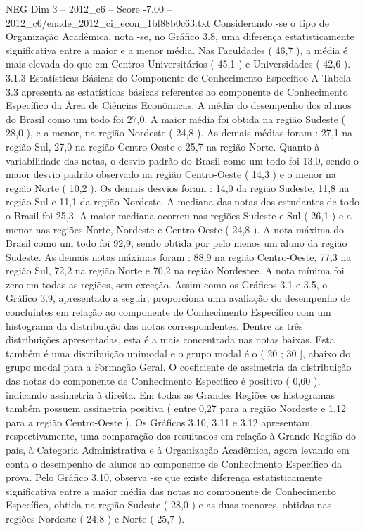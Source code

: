 \begin{textsample}{NEG Dim 3 – 2012\_c6 – Score -7.00 – 2012\_c6/enade\_2012\_ci\_econ\_1bf88b0c63.txt}
Considerando -se o tipo de Organização Acadêmica, nota -se, no Gráfico 3.8, uma diferença estatisticamente significativa entre a maior e a menor média.
Nas Faculdades ( 46,7 ), a média é mais elevada do que em Centros Universitários ( 45,1 ) e Universidades ( 42,6 ). 3.1.3 Estatísticas Básicas do Componente de Conhecimento Específico A Tabela 3.3 apresenta as estatísticas básicas referentes ao componente de Conhecimento Específico da Área de Ciências Econômicas.
A média do desempenho dos alunos do Brasil como um todo foi 27,0.
A maior média foi obtida na região Sudeste ( 28,0 ), e a menor, na região Nordeste ( 24,8 ).
As demais médias foram : 27,1 na região Sul, 27,0 na região Centro-Oeste e 25,7 na região Norte.
Quanto à variabilidade das notas, o desvio padrão do Brasil como um todo foi 13,0, sendo o maior desvio padrão observado na região Centro-Oeste ( 14,3 ) e o menor na região Norte ( 10,2 ).
Os demais desvios foram : 14,0 da região Sudeste, 11,8 na região Sul e 11,1 da região Nordeste.
A mediana das notas dos estudantes de todo o Brasil foi 25,3.
A maior mediana ocorreu nas regiões Sudeste e Sul ( 26,1 ) e a menor nas regiões Norte, Nordeste e Centro-Oeste ( 24,8 ).
A nota máxima do Brasil como um todo foi 92,9, sendo obtida por pelo menos um aluno da região Sudeste.
As demais notas máximas foram : 88,9 na região Centro-Oeste, 77,3 na região Sul, 72,2 na região Norte e 70,2 na região Nordestee.
A nota mínima foi zero em todas as regiões, sem exceção.
Assim como os Gráficos 3.1 e 3.5, o Gráfico 3.9, apresentado a seguir, proporciona uma avaliação do desempenho de concluintes em relação ao componente de Conhecimento Específico com um histograma da distribuição das notas correspondentes.
Dentre as três distribuições apresentadas, esta é a mais concentrada nas notas baixas.
Esta também é uma distribuição unimodal e o grupo modal é o ( 20 ; 30 ], abaixo do grupo modal para a Formação Geral.
O coeficiente de assimetria da distribuição das notas do componente de Conhecimento Específico é positivo ( 0,60 ), indicando assimetria à direita.
Em todas as Grandes Regiões os histogramas também possuem assimetria positiva ( entre 0,27 para a região Nordeste e 1,12 para a região Centro-Oeste ).
Os Gráficos 3.10, 3.11 e 3.12 apresentam, respectivamente, uma comparação dos resultados em relação à Grande Região do país, à Categoria Administrativa e à Organização Acadêmica, agora levando em conta o desempenho de alunos no componente de Conhecimento Específico da prova.
Pelo Gráfico 3.10, observa -se que existe diferença estatisticamente significativa entre a maior média das notas no componente de Conhecimento Específico, obtida na região Sudeste ( 28,0 ) e as duas menores, obtidas nas regiões Nordeste ( 24,8 ) e Norte ( 25,7 ).

\end{textsample}
